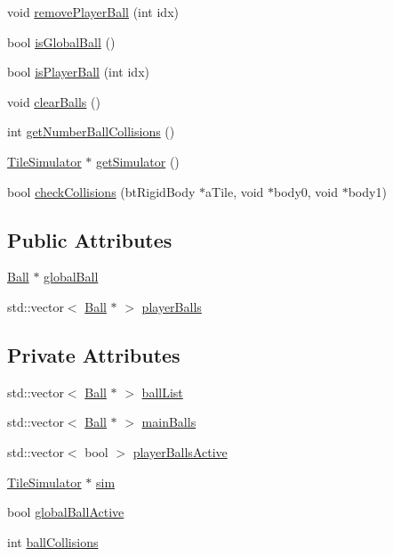 \begin{DoxyCompactItemize}
\item 
void \hyperlink{classBallManager_aed24becd95e79961c36c662a19015f6d}{remove\-Player\-Ball} (int idx)
\item 
bool \hyperlink{classBallManager_a72cf25f9ffa0152ca83103ed96ce1fe9}{is\-Global\-Ball} ()
\item 
bool \hyperlink{classBallManager_a97d94a1b04f158a695211022b0377d2a}{is\-Player\-Ball} (int idx)
\item 
void \hyperlink{classBallManager_af51544444357484c9e58bd63f443de57}{clear\-Balls} ()
\item 
int \hyperlink{classBallManager_a248e05bd9da981386a3f22ed5f4476a6}{get\-Number\-Ball\-Collisions} ()
\item 
\hyperlink{classTileSimulator}{Tile\-Simulator} $\ast$ \hyperlink{classBallManager_a73c4e097e977317ebdb53c32fe72441b}{get\-Simulator} ()
\item 
bool \hyperlink{classBallManager_aaaa28fd371dc2b04d5973f0a8ef6f956}{check\-Collisions} (bt\-Rigid\-Body $\ast$a\-Tile, void $\ast$body0, void $\ast$body1)
\end{DoxyCompactItemize}
\subsection*{Public Attributes}
\begin{DoxyCompactItemize}
\item 
\hyperlink{classBall}{Ball} $\ast$ \hyperlink{classBallManager_a9fbb6953ccffca39d124c4867a03d6e5}{global\-Ball}
\item 
std\-::vector$<$ \hyperlink{classBall}{Ball} $\ast$ $>$ \hyperlink{classBallManager_aa5d4641a04755987d725c8df64ce5c84}{player\-Balls}
\end{DoxyCompactItemize}
\subsection*{Private Attributes}
\begin{DoxyCompactItemize}
\item 
std\-::vector$<$ \hyperlink{classBall}{Ball} $\ast$ $>$ \hyperlink{classBallManager_a7a32cb0f1dce0a3c51430ead4918a21e}{ball\-List}
\item 
std\-::vector$<$ \hyperlink{classBall}{Ball} $\ast$ $>$ \hyperlink{classBallManager_a3de8a29f89c02241ef9dd1bc85bcb6f8}{main\-Balls}
\item 
std\-::vector$<$ bool $>$ \hyperlink{classBallManager_a1deaf66727d7a5e399712de6412379f2}{player\-Balls\-Active}
\item 
\hyperlink{classTileSimulator}{Tile\-Simulator} $\ast$ \hyperlink{classBallManager_a4916de0948df0af060f6ada4d21284a7}{sim}
\item 
bool \hyperlink{classBallManager_a4f86decb02dc070a4ddf4d408620acf4}{global\-Ball\-Active}
\item 
int \hyperlink{classBallManager_aeb2e197deeeb39af34ceef5e0f7f5535}{ball\-Collisions}
\end{DoxyCompactItemize}


